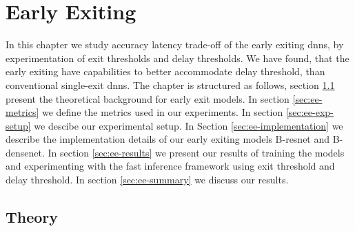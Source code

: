\hypertarget{earlyexiting}{%
	\chapter{Early Exiting}\label{ch:earlyexit}}
\thispagestyle{fancy}

In this chapter we study accuracy latency trade-off of the early exiting \gls{dnn}s, by experimentation of exit thresholds and delay thresholds. We have found, that the early exiting have capabilities to better accommodate delay threshold, than conventional single-exit \gls{dnn}s. The chapter is structured as follows, section \ref{sec:ee-theory} present the theoretical background for early exit models. In section \ref{sec:ee-metrics} we define the metrics used in our experiments. In section \ref{sec:ee-exp-setup} we descibe our experimental setup. In Section \ref{sec:ee-implementation} we describe the implementation details of our early exiting models B-\gls{resnet} and B-\gls{densenet}. In section \ref{sec:ee-results} we present our results of training the models and experimenting with the fast inference framework using exit threshold and delay threshold. In section \ref{sec:ee-summary} we discuss our results.

\section{Theory} \label{sec:ee-theory}




%

